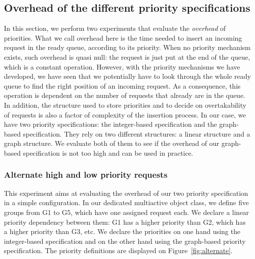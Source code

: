 \documentclass[11pt]{report}
\begin{document}
\subsection{Overhead of the different priority specifications}
In this section, we perform two experiments that evaluate the \emph{overhead} of priorities. What we call overhead here is the time needed to insert an incoming request in the ready queue, according to its priority. When no priority mechanism exists, such overhead is quasi null: the request is just put at the end of the queue, which is a constant operation. However, with the priority mechanisms we have developed, we have seen that we potentially have to look through the whole ready queue to find the right position of an incoming request. As a consequence, this operation is dependent on the number of requests that already are in the queue. In addition, the structure used to store priorities and to decide on overtakability of requests is also a factor of complexity of the insertion process. In our case, we have two priority specifications: the integer-based specification and the graph-based specification. They rely on two different structures: a linear structure and a graph structure. We evaluate both of them to see if the overhead of our graph-based specification is not too high and can be used in practice. 

\subsubsection{Alternate high and low priority requests}
This experiment aims at evaluating the overhead of our two priority specification in a simple configuration. In our dedicated multiactive object class, we define five groups from G1 to G5, which have one assigned request each. We declare a linear priority dependency between them: G1 has a higher priority than G2, which has a higher priority than G3, etc. We declare the priorities on one hand using the integer-based specification and on the other hand using the graph-based priority specification. The priority definitions are displayed on Figure~\ref{fig:alternate}.
\end{document}
